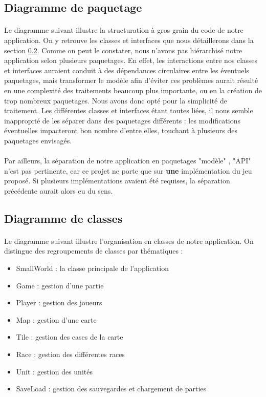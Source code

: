 \documentclass[a4paper]{article}
\begin{document}
\subsection{Diagramme de paquetage}
\paragraph{}
Le diagramme suivant illustre la structuration à gros grain du code de notre application. On y retrouve les classes et interfaces que nous détaillerons dans la section \ref{DDC}.
Comme on peut le constater, nous n'avons pas hiérarchisé notre application selon plusieurs paquetages. En effet, les interactions entre nos classes et interfaces auraient conduit à des dépendances circulaires entre les éventuels paquetages, mais transformer le modèle afin d'éviter ces problèmes aurait résulté en une complexité des traitements beaucoup plus importante, ou en la création de trop nombreux paquetages. Nous avons donc opté pour la simplicité de traitement. Les différentes classes et interfaces étant toutes liées, il nous semble inapproprié de les séparer dans des paquetages différents : les modifications éventuelles impacteront bon nombre d'entre elles, touchant à plusieurs des paquetages envisagés.

\paragraph{}
Par ailleurs, la séparation de notre application en paquetages "modèle" , "API" n'est pas pertinente, car ce projet ne porte que sur \textbf{une} implémentation du jeu proposé. Si plusieurs implémentations avaient été requises, la séparation précédente aurait alors eu du sens.



\subsection{Diagramme de classes}
\label{DDC}
\paragraph{}
Le diagramme suivant illustre l'organisation en classes de notre application.
On distingue des regroupements de classes par thématiques : 
\begin{itemize}
    \item SmallWorld : la classe principale de l'application
    \item Game : gestion d'une partie
    \item Player : gestion des joueurs
    \item Map : gestion d'une carte
    \item Tile : gestion des cases de la carte
    \item Race : gestion des différentes races
    \item Unit : gestion des unités
    \item SaveLoad : gestion des sauvegardes et chargement de parties
\end{itemize}
\end{document}

